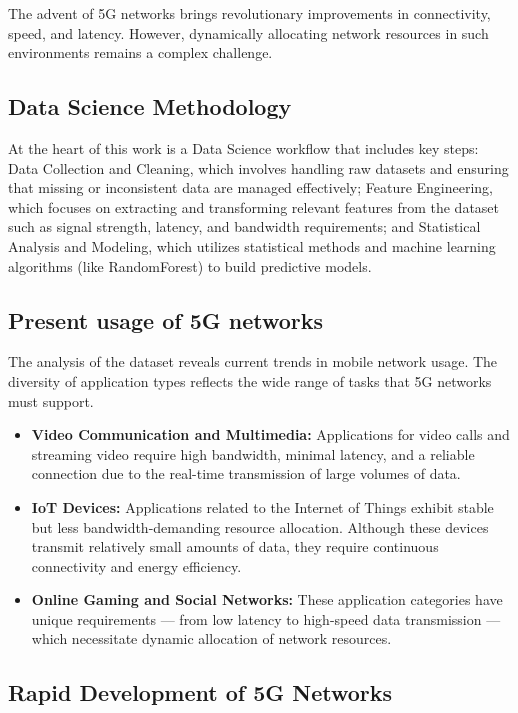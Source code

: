 \documentclass[a4paper, 10pt, twocolumn]{article}
\begin{document}
The advent of 5G networks brings revolutionary improvements in connectivity, speed, and latency. However, dynamically allocating network resources in such environments remains a complex challenge. 

\subsection{Data Science Methodology}

At the heart of this work is a Data Science workflow that includes key steps: Data Collection and Cleaning, which involves handling raw datasets and ensuring that missing or inconsistent data are managed effectively; Feature Engineering, which focuses on extracting and transforming relevant features from the dataset such as signal strength, latency, and bandwidth requirements; and Statistical Analysis and Modeling, which utilizes statistical methods and machine learning algorithms (like RandomForest) to build predictive models.

\subsection{Present usage of 5G networks}
The analysis of the dataset reveals current trends in mobile network usage. The diversity of application types reflects the wide range of tasks that 5G networks must support.
\begin{itemize}
    \item \textbf{Video Communication and Multimedia:} Applications for video calls and streaming video require high bandwidth, minimal latency, and a reliable connection due to the real-time transmission of large volumes of data.
    \item \textbf{IoT Devices:} Applications related to the Internet of Things exhibit stable but less bandwidth-demanding resource allocation. Although these devices transmit relatively small amounts of data, they require continuous connectivity and energy efficiency.
    \item \textbf{Online Gaming and Social Networks:} These application categories have unique requirements — from low latency to high-speed data transmission — which necessitate dynamic allocation of network resources.
\end{itemize}

\subsection{Rapid Development of 5G Networks}
\end{document}
